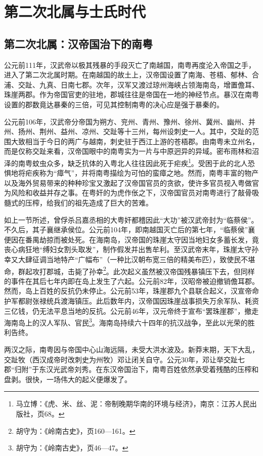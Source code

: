 \chapter{第二次北属与士氏时代}

\section{第二次北属：汉帝国治下的南粤}

公元前111年，汉武帝以极其残暴的手段灭亡了南越国，南粤再度沦入帝国之手，进入了第二次北属时期。在南越国的故土上，汉帝国设置了南海、苍梧、郁林、合浦、交趾、九真、日南七郡。次年，汉军又渡过琼州海峡占领海南岛，增置儋耳、珠崖两郡。作为帝国官吏的驻地，郡城往往是帝国在一地的神经节点。暴汉在南粤设置的郡数竟达暴秦的三倍，可见其控制南粤的决心应是强于暴秦的。

公元前106年，汉武帝分帝国为朔方、兖州、青州、豫州、徐州、冀州、幽州、并州、扬州、荆州、益州、凉州、交趾等十三州，每州设刺史一人。其中，交趾的范围大致相当于今日的两广与越南，刺史驻于西江上游的苍梧郡。由南粤未立州名，而是仅称交趾来看，汉帝国眼中的南粤实为一片与中原迥异的异域。密布雨林和沼泽的南粤蚊虫众多，缺乏抗体的入粤北人往往因此死于疟疾\footnote{马立博：《虎、米、丝、泥：帝制晚期华南的环境与经济》，南京：江苏人民出版社，页68。}。受困于此的北人恐惧地将疟疾称为“瘴气”，并将南粤描绘为可怕的蛮瘴之地。然而，南粤丰富的物产以及海外贸易带来的种种珍宝又激起了汉帝国官员的贪欲，使许多官员视入粤做官为风险和收益并存之事。在粤奸的为虎作伥之下，汉帝国官员对南粤进行了敲骨吸髓式的压榨，给我们的祖先造成了巨大的苦难。

如上一节所述，曾俘杀吕嘉丞相的大粤奸都稽因此“大功”被汉武帝封为“临蔡侯”。不久后，其子襄继承侯位。公元前104年，即南越国灭亡后的第七年，“临蔡侯”襄便因在番禺劫掠而被处死。在海南岛，汉帝国的珠崖太守因当地妇女多蓄长发，竟丧心病狂地“缚妇女割头取发”，制作假发并出售牟利。至汉武帝末年，珠崖太守孙幸又大肆征调当地特产“广幅布”（一种比汉朝布宽三倍的精美布匹），致使民不堪命，群起攻打郡城，击毙了孙幸\footnote{胡守为：《岭南古史》，页160—161。}。此次起义虽然被汉帝国残暴镇压下去，但同样的事件在其后七年内即在岛上发生了六起。公元前82年，汉昭帝被迫撤销儋耳郡。然而，岛上百姓的反抗仍未停止。公元前53年，珠崖郡九个县联合起义，汉宣帝命护军都尉张禄统兵渡海镇压。此后数年内，汉帝国因珠崖战事损失万余军队、耗资三亿钱，仍无法平息当地的反抗。公元前46年，汉元帝终于宣布“罢珠崖郡”，撤走海南岛上的汉人军队、官民\footnote{胡守为：《岭南古史》，页46—47。}。海南岛持续六十四年的抗汉战争，至此以光荣的胜利告终。

两汉之际，南粤因与帝国中心山海远隔，未受大洪水波及。新莽末期，天下大乱，交趾牧（西汉成帝时改刺史为州牧）邓让闭关自守。公元30年，邓让举交趾七郡“归附”于东汉光武帝刘秀。在东汉帝国治下，南粤百姓依然承受着残酷的压榨和盘剥。很快，一场伟大的起义便爆发了。

